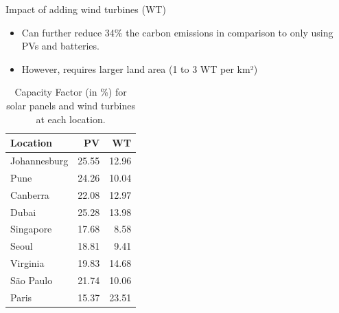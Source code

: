 \documentclass[Ligatures=TeX,table,svgnames,usetotalslideindicator,compress,10pt]{beamer}
\begin{document}
\begin{frame}{Impact of adding wind turbines (WT) }

  \begin{itemize}    
     \item  Can further reduce 34\% the carbon emissions in comparison
       to only using PVs and batteries.
     \item However, requires larger land area (1 to 3 WT per km²)
  \end{itemize}



\begin{table}[H]
  
  \caption{Capacity Factor (in \%) for solar panels and wind turbines at each location.}\label{tab:capacity_factor} \centering
  
  \begin{tabular}{|l|r|r|}
  \hline    
  \textbf{Location} &   \textbf{PV} & \textbf{WT}  \\
  \hline
  Johannesburg & 25.55 & 12.96  \\
  \hline
  Pune        &  24.26   & 10.04    \\
  \hline
  Canberra    & 22.08    & 12.97  \\
  \hline
  Dubai      & 25.28      & 13.98   \\
  \hline
  Singapore & 17.68    & 8.58   \\
  \hline     
  Seoul      & 18.81   &  9.41   \\
  \hline
  Virginia   & 19.83   &  14.68 \\
  \hline
  São Paulo  & 21.74   &  10.06    \\
  \hline 
  Paris      & 15.37   &  23.51   \\
  \hline  

\end{tabular}
\end{table}
  
\end{frame}
\end{document}
